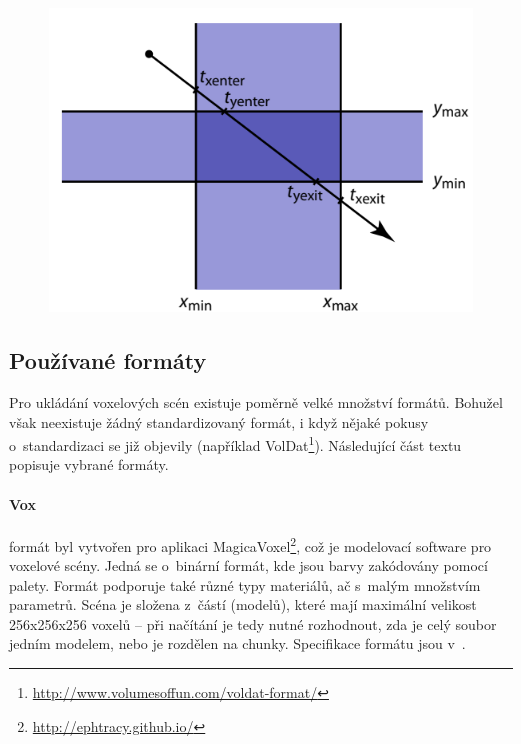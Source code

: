 \begin{figure}[H]
	\centering
	\includegraphics[scale=1.3]{obrazky-figures/slab_intersect.png}
	\captionsetup{justification=centering}
	\label{fig:slabs}
\end{figure}


\subsection{Používané formáty} \label{sec:format}
Pro ukládání voxelových scén existuje poměrně velké množství formátů. Bohužel však neexistuje žádný standardizovaný formát, i když nějaké pokusy o~standardizaci se již objevily (například VolDat\footnote{\url{http://www.volumesoffun.com/voldat-format/}}). Následující část textu popisuje vybrané formáty.

\paragraph{Vox} formát byl vytvořen pro aplikaci MagicaVoxel\footnote{\url{http://ephtracy.github.io/}}, což je modelovací software pro voxelové scény. Jedná se o~binární formát, kde jsou barvy zakódovány pomocí palety. Formát podporuje také různé typy materiálů, ač s~malým množstvím parametrů. Scéna je složena z~částí (modelů), které mají maximální velikost 256x256x256 voxelů -- při načítání je tedy nutné rozhodnout, zda je celý soubor jedním modelem, nebo je rozdělen na chunky. Specifikace formátu jsou v~\cite{vox_format}.

